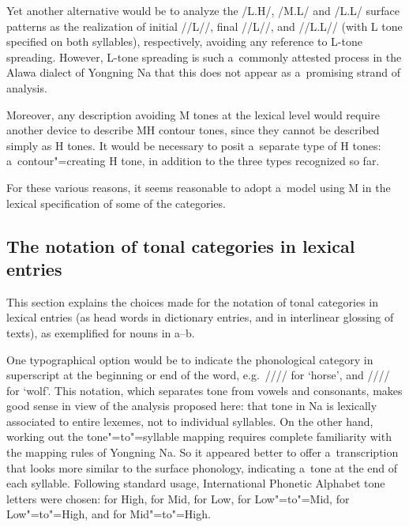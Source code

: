 {{{{{Yet another alternative would be to analyze the /L.H/, /M.L/ and /L.L/ surface patterns as the
realization of initial //L//, final //L//, and //L.L// (with L tone specified on both syllables),
respectively, avoiding any reference to L-tone spreading. However, L-tone spreading is such
a~commonly attested process in the Alawa dialect of Yongning Na that this does not appear as a~promising strand of analysis. 

Moreover, any description avoiding M tones at the lexical level would require another device to describe MH contour tones, since they cannot be described simply as H tones. It would be necessary to posit a~separate type of H tones:
a~{contour}"=creating H tone, in addition to the three types recognized so far. 

For these various reasons, it seems reasonable to adopt a~model using M in the lexical
specification of some of the categories.


\subsection{The notation of tonal categories in lexical entries}
\label{sec:thenotationoftonalcategoriesinlexicalentries}

This section explains the choices made for the notation of tonal categories in lexical entries
(as head words in dictionary entries, and in interlinear glossing of texts), as exemplified for nouns in a--b.

One typographical option would be to indicate the phonological category in superscript at the beginning or end of
the word, e.g.~//// for ‘horse’, and //// for ‘wolf’. This notation, which
separates tone from vowels and consonants, makes good sense in view of the analysis proposed here: that tone in Na is lexically associated to entire lexemes,
not to individual syllables. On the other hand, working out the tone"=to"=syllable mapping requires
complete familiarity with the mapping rules of Yongning Na. So it appeared better to offer a~transcription
that looks more similar to the surface phonology, indicating a~tone at the end of each syllable. Following
standard usage, International Phonetic Alphabet tone letters \citep{chao1930} were chosen:  for
High,  for Mid,  for Low,  for Low"=to"=Mid,  for Low"=to"=High, and  for Mid"=to"=High.

}}}}}
